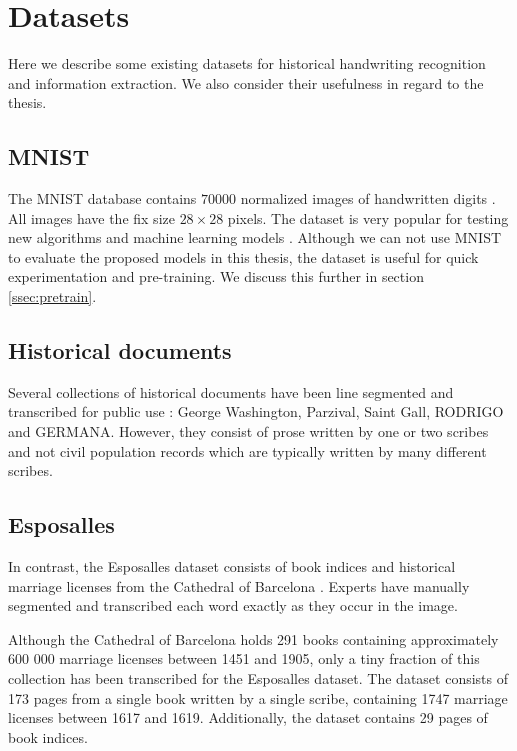 \section{Datasets}

Here we describe some existing datasets for historical handwriting recognition and information extraction. We also consider their usefulness in regard to the thesis.



\subsection{MNIST}

The MNIST database contains $70000$ normalized images of handwritten digits \cite{MNIST_orig}. All images have the fix size $28 \times 28$ pixels. The dataset is very popular for testing new algorithms and machine learning models \cite{MNIST}.
Although we can not use MNIST to evaluate the proposed models in this thesis, the dataset is useful for quick experimentation and pre-training. We discuss this further in section \ref{ssec:pretrain}.

\subsection{Historical documents}
Several collections of historical documents have been line segmented and transcribed for public use \cite{esposalles}: George Washington, Parzival, Saint Gall, RODRIGO and GERMANA. However, they consist of prose written by one or two scribes and not civil population records which are typically written by many different scribes.

\subsection{Esposalles}
In contrast, the Esposalles dataset consists of book indices and historical marriage licenses from the Cathedral of Barcelona \cite{esposalles}. Experts have manually segmented and transcribed each word exactly as they occur in the image.

Although the Cathedral of Barcelona holds 291 books containing approximately 600 000 marriage licenses between 1451 and 1905, only a tiny fraction of this collection has been transcribed for the Esposalles dataset. The dataset consists of 173 pages from a single book written by a single scribe, containing 1747 marriage licenses between 1617 and 1619. Additionally, the dataset contains 29 pages of book indices.

